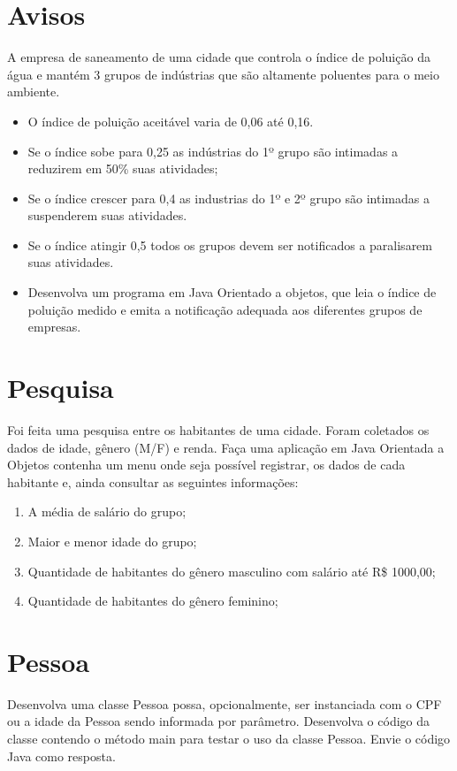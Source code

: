 \documentclass[12pt,a4paper, brazil]{article}
\begin{document}
 \dotfill
 
\section{Avisos}
\par
A empresa de saneamento de uma cidade que controla o índice de poluição da água e mantém 3 grupos de indústrias que são altamente poluentes para o meio ambiente.
    \begin{itemize}
        \item O índice de poluição aceitável varia de 0,06 até 0,16. 
        \item Se o índice sobe para 0,25 as indústrias do 1º grupo são intimadas a reduzirem em 50\% suas atividades;
        \item Se o índice crescer para 0,4 as industrias do 1º e 2º grupo são intimadas a suspenderem suas atividades.
        \item Se o índice atingir 0,5 todos os grupos devem ser notificados a paralisarem suas atividades. 
        \item Desenvolva um programa em Java Orientado a objetos, que leia o índice de poluição medido e emita a notificação adequada aos diferentes grupos de empresas.
    \end{itemize}

 \dotfill

\section{Pesquisa}
\par
Foi feita uma pesquisa entre os habitantes de uma cidade. Foram coletados os dados de idade, gênero (M/F) e renda. Faça uma aplicação em Java Orientada a Objetos  contenha um menu onde seja possível registrar, os dados de cada habitante e, ainda consultar as seguintes informações:
  \begin{enumerate}
      \item A média de salário do grupo;
      \item Maior e menor idade do grupo;
      \item Quantidade de habitantes do gênero masculino com salário até R\$ 1000,00;
      \item Quantidade de habitantes do gênero feminino;
  \end{enumerate}

 \dotfill
\section{Pessoa}
\par
Desenvolva uma classe Pessoa possa, opcionalmente, ser instanciada com o CPF ou a idade da Pessoa sendo informada por parâmetro. Desenvolva o código da classe contendo o método main para testar o uso da classe Pessoa. Envie o código Java como resposta.
 \dotfill
 
\end{document}
